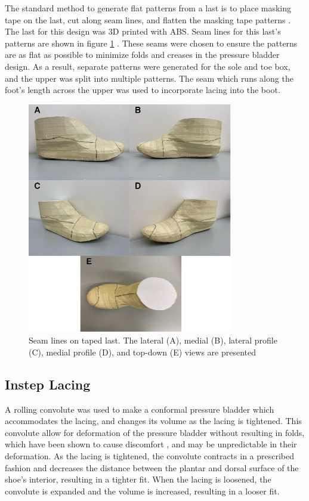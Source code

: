 \documentclass[defaultstyle,11pt]{thesis}
\begin{document}
The standard method to generate flat patterns from a last is to place masking tape on the last, cut along seam lines, and flatten the masking tape patterns \citep{Motawi2020}.
The last for this design was 3D printed with ABS.
Seam lines for this last's patterns are shown in figure \ref{fig:SA3-lasttape} .
These seams were chosen to ensure the patterns are as flat as possible to minimize folds and creases in the pressure bladder design.
As a result, separate patterns were generated for the sole and toe box, and the upper was split into multiple patterns.
The seam which runs along the foot's length across the upper was used to incorporate lacing into the boot.

\hypertarget{fig:SA3-lasttape}{%
\begin{figure}
\centering
\includegraphics[width=0.8\textwidth,height=\textheight]{../fig/SA3/Last_Taping_Seams.png}
\caption[{Seam lines on taped last}]{Seam lines on taped last. The lateral (A), medial (B), lateral profile (C), medial profile (D), and top-down (E) views are presented}
\label{fig:SA3-lasttape}
\end{figure}
}

\hypertarget{instep-lacing}{%
\subsection{Instep Lacing}\label{instep-lacing}}

A rolling convolute was used to make a conformal pressure bladder which accommodates the lacing, and changes its volume as the lacing is tightened.
This convolute allow for deformation of the pressure bladder without resulting in folds, which have been shown to cause discomfort \citep{Chappell2017}, and may be unpredictable in their deformation.
As the lacing is tightened, the convolute contracts in a prescribed fashion and decreases the distance between the plantar and dorsal surface of the shoe's interior, resulting in a tighter fit.
When the lacing is loosened, the convolute is expanded and the volume is increased, resulting in a looser fit.
\end{document}
